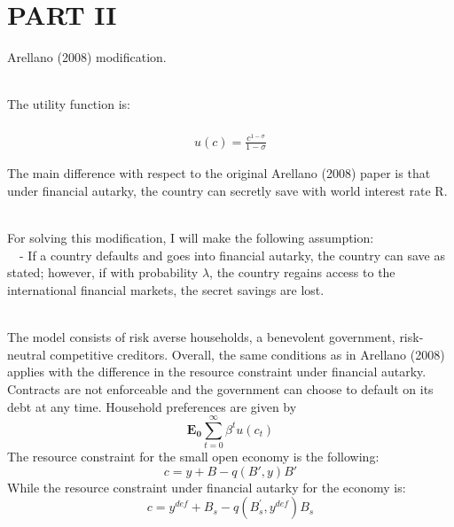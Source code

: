 \documentclass[a4paper]{article}
\begin{document}



\section{PART II}

Arellano (2008) modification.\\~\

The utility function is:\\~\
\begin{align*}
u(c) = \frac{c^{1-\sigma}}{1-\sigma} 
\end{align*}

The main difference with respect to the original Arellano (2008) paper is that under financial autarky, the country can secretly save with world interest rate R.\\~\

For solving this modification, I will make the following assumption:\\~\
- If a country defaults and goes into financial autarky, the country can save as stated; however, if with probability $\lambda$, the country regains access to the international financial markets, the secret savings are lost.\\~\

The model consists of risk averse households, a benevolent government, risk-neutral competitive creditors. Overall, the same conditions as in Arellano (2008) applies with the difference in the resource constraint under financial autarky. Contracts are not enforceable and the government can choose to default on its debt at any time. Household preferences are given by
\begin{equation}
\mathbf{E_0} \sum_{t=0}^{\infty} \beta^{t} u(c_{t})
\end{equation}
The resource constraint for the small open economy is the following:
\begin{equation}
c = y + B - q(B',y)B'
\end{equation}
While the resource constraint under financial autarky for the economy is:
\begin{equation}
c = y^{def} + B_{s} - q(B_{s}^{'},y^{def})B_{s}
\end{equation}
\end{document}
